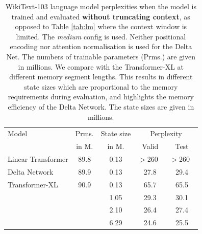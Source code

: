 \documentclass{article}
\theoremstyle{definition}
\begin{document}
\begin{table}[t]
\caption{
WikiText-103 language model perplexities
when the model is trained and evaluated \textbf{without truncating context},
as opposed to Table \ref{tab:lm} where the context window is limited.
The \textit{medium} config is used.
Neither positional encoding nor attention normalisation
is used for the Delta Net.
The numbers of trainable parameters (Prms.) are given in millions.
We compare with the Transformer-XL at different memory segment lengths.
This results in different state sizes which are proportional to the memory requirements during evaluation,
and highlights the memory efficiency of the Delta Network. 
The state sizes are given in millions.
}
\label{tab:lm-cco}
\vskip 0.15in
\begin{center}
\setlength{\tabcolsep}{0.4em}
\begin{small}
\begin{tabular}{lcccc}
\toprule
Model & Prms.  & State size & \multicolumn{2}{c}{Perplexity}   \vspace{1mm} \\ 
 &  in M. & in M. & Valid & Test   \\ \midrule
Linear Transformer      & 89.8 & 0.13  &  $>$260 $\;$  & $>$260 $\;$ \\
Delta Network  & 89.9 & 0.13 &  27.8   & 29.4  \\  %
\midrule
Transformer-XL & 90.9 & 0.13 &  65.7  & 65.5   \\
&  &  1.05 & 29.3  & 30.1  \\ %
& & 2.10  &  26.4  & 27.4  \\  %
& & 6.29 &  24.6  & 25.5  \\
\bottomrule
\end{tabular}
\end{small}
\end{center}
\vskip -0.1in


\end{table}
\end{document}
